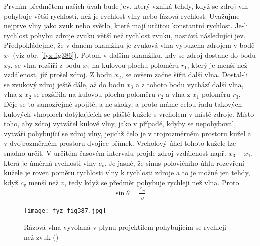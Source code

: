 {  Prvním předmětem našich úvah bude jev, který vzniká tehdy, když se zdroj vln pohybuje větší 
  rychlostí, než je rychlost vlny nebo fázová rychlost. Uvažujme nejprve vlny jako zvuk nebo 
  světlo, které mají určitou konstantní rychlost. Je-li rychlost pohybu zdroje zvuku větší než 
  rychlost zvuku, nastává následující jev. Předpokládejme, že v daném okamžiku je zvuková vlna 
  vybuzena zdrojem v bodě \(x_1\) (viz obr. \ref{fyz:fig386}). Potom v dalším okamžiku, kdy se 
  zdroj dostane do bodu \(x_2\), se vlna rozšíří z bodu \(x_1\) na kulovou plochu poloměru \(r_1\), 
  který je menší než vzdálenost, jíž prošel zdroj. Z bodu \(x_2\), se ovšem začne šířit další vlna. 
  Dostal-li se zvukový zdroj ještě dále, až do bodu \(x_3\) a z tohoto bodu vychází další vlna, 
  vlna z \(x_2\) se rozšířila na kulovou plochu poloměru \(r_2\) a vlna z \(x_1\) poloměru \(r_3\). 
  Děje se to samozřejmě spojitě, a ne skoky, a proto máme celou řadu takových kulových vlnoploch 
  dotýkajících se pláště kužele s vrcholem v místě zdroje. Místo toho, aby zdroj vytvářel kulové 
  vlny, jako v případě, kdyby se nepohyboval, vytváří pohybující se zdroj vlny, jejichž čelo je v 
  trojrozměrném prostoru kužel a v dvojrozměrném prostoru dvojice přímek. Vrcholový úhel tohoto 
  kužele lze snadno určit. V určitém časovém intervalu projde zdroj vzdálenost např. \(x_3 - x_1\), 
  která je úměrná rychlosti vlny \(c_v\). Je jasné, že sinus polovičního úhlu rozevření kužele je 
  roven poměru rychlosti vlny k rychlosti zdroje a to je možné jen tehdy, když \(c_v\) menší než 
  \(v\), tedy když se předmět pohybuje rychleji než vlna. Proto
  \begin{equation}\label{fyz:eq527}
    \sin\theta = \dfrac{c_v}{v}
  \end{equation}
  
  \begin{figure}[ht!] %
    \centering
    \texttt{[image: fyz\_fig387.jpg]}
    \caption{Rázová vlna vyvolaná v plynu projektilem pohybujícím se rychleji než zvuk
             (\cite[s.~687]{Feynman01})}
    \label{fyz:fig387}
  \end{figure}
  
}
